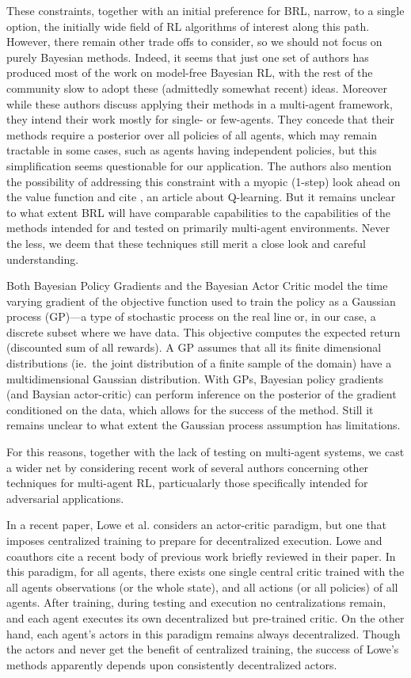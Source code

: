 \documentclass{article}
\begin{document}
These constraints, together with an initial preference for BRL,
narrow, to a single option, the initially wide field of RL algorithms
of interest along this path.  However, there remain other trade offs
to consider, so we should not focus on purely Bayesian methods.
Indeed, it seems that just one set of authors has produced most of the
work on model-free Bayesian RL, with the rest of the community slow to
adopt these (admittedly somewhat recent) ideas.  Moreover while these
authors discuss applying their methods in a multi-agent framework,
they intend their work mostly for single- or few-agents.  They concede
that their methods require a posterior over all policies of all
agents, which may remain tractable in some cases, such as agents
having independent policies, but this simplification seems
questionable for our application.  The authors also mention the
possibility of addressing this constraint with a myopic (1-step) look
ahead on the value function and cite \cite{dearden1998bayesian}, an
article about Q-learning.  But it remains unclear to what extent BRL
will have comparable capabilities to the capabilities of the methods
intended for and tested on primarily multi-agent environments.  Never
the less, we deem that these techniques still merit a close look and
careful understanding.

Both Bayesian Policy Gradients and the Bayesian Actor Critic model the
time varying gradient of the objective function used to train the
policy as a Gaussian process (GP)---a type of stochastic process on
the real line or, in our case, a discrete subset where we have data.
This objective computes the expected return (discounted sum of all
rewards).  A GP assumes that all its finite dimensional distributions
(ie.\ the joint distribution of a finite sample of the domain) have a
multidimensional Gaussian distribution. With GPs, Bayesian policy
gradients (and Baysian actor-critic) can perform inference on the
posterior of the gradient conditioned on the data, which allows for
the success of the method.  Still it remains unclear to what extent
the Gaussian process assumption has limitations.

For this reasons, together with the lack of testing on multi-agent
systems, we cast a wider net by considering recent work of several
authors concerning other techniques for multi-agent RL, particualarly
those specifically intended for adversarial applications.

In a recent paper, Lowe et al. \cite{lowe2017multi} considers an
actor-critic paradigm, but one that imposes centralized training to
prepare for decentralized execution.  Lowe and coauthors cite a recent
body of previous work briefly reviewed in their paper.  In this
paradigm, for all agents, there exists one single central critic
trained with the all agents observations (or the whole state), and all
actions (or all policies) of all agents.  After training, during
testing and execution no centralizations remain, and each agent
executes its own decentralized but pre-trained critic.  On the other
hand, each agent's actors in this paradigm remains always
decentralized.  Though the actors and never get the benefit of
centralized training, the success of Lowe's methods apparently depends
upon consistently decentralized actors.
\end{document}
